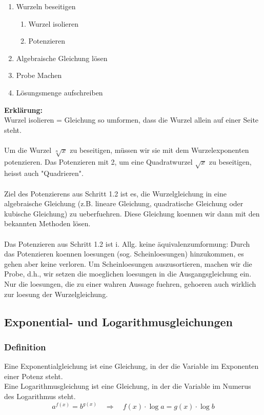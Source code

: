 \begin{multicols}{2}
    \begin{enumerate}
        \item Wurzeln beseitigen
              \begin{enumerate}
                  \item Wurzel isolieren
                  \item Potenzieren
              \end{enumerate}
        \item Algebraische Gleichung lösen
        \item Probe Machen
        \item Lösungsmenge aufschreiben
    \end{enumerate}
    \textbf{Erklärung:} \\
    Wurzel isolieren = Gleichung so umformen, dass die Wurzel allein auf einer Seite steht. \\~\\
    Um die Wurzel $\sqrt[n]{x}$ zu beseitigen, müssen wir sie mit dem Wurzelexponenten potenzieren. Das Potenzieren mit 2, um eine Quadratwurzel $\sqrt{x}$ zu beseitigen, heisst auch "Quadrieren". \\~\\
    Ziel des Potenzierens aus Schritt 1.2 ist es, die Wurzelgleichung in eine algebraische Gleichung (z.B. lineare Gleichung, quadratische Gleichung oder kubische Gleichung) zu ueberfuehren. Diese Gleichung koennen wir dann mit den bekannten Methoden lösen. \\~\\
    Das Potenzieren aus Schritt 1.2 ist i. Allg. keine äquivalenzumformung: Durch das Potenzieren koennen loesungen (sog. Scheinloesungen) hinzukommen, es gehen aber keine verloren.
    Um Scheinloesungen auszusortieren, machen wir die Probe, d.h., wir setzen die moeglichen loesungen in die Ausgangsgleichung ein. Nur die loesungen, die zu einer wahren Aussage fuehren, gehoeren auch wirklich zur loesung der Wurzelgleichung.


    \subsection{Exponential- und Logarithmusgleichungen}
    \vspace{-4mm}
    \subsubsection{Definition}
    \vspace{-4mm}
    Eine Exponentialgleichung ist eine Gleichung, in der die Variable im Exponenten einer Potenz steht. \\
    Eine Logarithmusgleichung ist eine Gleichung, in der die Variable im Numerus des Logarithmus steht.
    \[a^{f(x)} = b^{g(x)} \quad \Rightarrow \quad f(x) \cdot \log a = g(x) \cdot \log b\]


\end{multicols}
